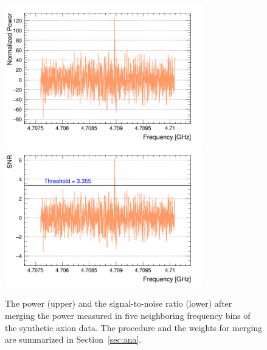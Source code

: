 \begin{figure}[htbp]                                                                                                  
    \centering                                                                                                                       
    \includegraphics[width=8.6cm]{figures/Power_GrandSpectrum_FaxionRun_AllSteps_Rescan_Merged_5bin_SG4_W201_LqWeight.png}
    \includegraphics[width=8.6cm]{figures/SNR_GrandSpectrum_FaxionRun_AllSteps_Rescan_Merged_5bin_SG4_W201_LqWeight.png}
    \caption{The power (upper) and the signal-to-noise ratio (lower) after 
merging the power measured in five neighboring frequency bins of the 
synthetic axion data. 
The procedure and the weights for merging 
are summarized in Section~\ref{sec:ana}.}                
\label{fig:faxionmerge}    
\end{figure}                       

   
